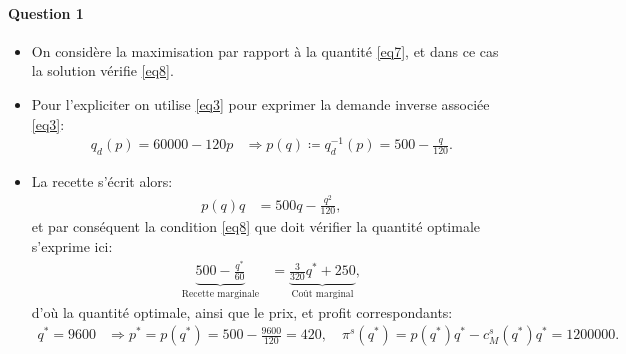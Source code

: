 \begin{frame}
  [allowframebreaks]{\insertsection}
  \framesubtitle{Question 1}
  \begin{itemize}
  \item On considère la maximisation par rapport à la quantité \eqref{eq7}, et dans ce cas la solution vérifie \eqref{eq8}.
  \item Pour l'expliciter on utilise \eqref{eq3} pour exprimer la demande inverse associée \eqref{eq3}:
  \begin{align*}
  q_d(p) = 60000 - 120p &\Rightarrow p(q) \coloneqq q_d^{-1}(p) =500- \frac{q}{120}.
  \end{align*}
 \item La recette s'écrit alors:
 \begin{align*}
p(q)q &= 500q -  \frac{q^2}{120},
 \end{align*}
 et par conséquent  la condition \eqref{eq8}  que doit vérifier la quantité optimale s'exprime ici:
 \begin{align*}
\underbrace{ 500 - \frac{q^*}{60}}_{\text{Recette marginale}} &=  \underbrace{\frac{3}{320}q^* + 250}_{\text{Coût marginal}},
 \end{align*}
 d'où la quantité optimale, ainsi que le prix, et profit correspondants:
  \begin{align*}
  q^* = 9600 &\Rightarrow p^*  = p(q^*) = 500 - \frac{9600}{120}= 420, \quad \pi^s(q^*) = p(q^*)q^* - c_M^s(q^*) q^* = 1200000.
   \end{align*}
  \end{itemize}
   \end{frame}
   
